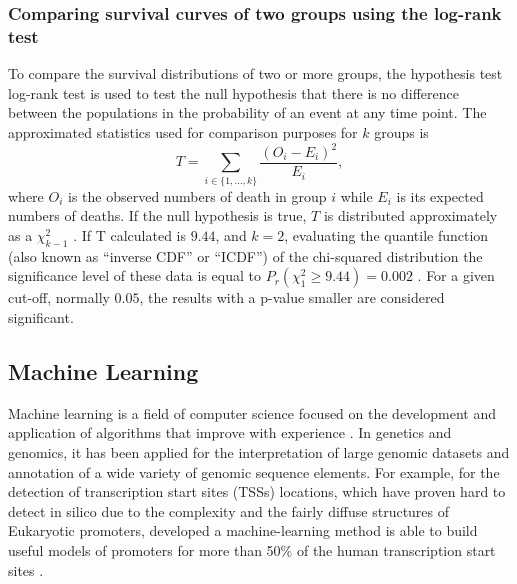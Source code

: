 
\subsubsection{Comparing survival curves of two groups using the log-rank test}

 To compare the survival distributions of two or more groups,  the hypothesis test log-rank test is
 used to test the null hypothesis that there is no difference between the populations
 in the probability of an event at any time point.
%
 The approximated statistics used for comparison purposes for $k$ groups is
 $$T = \sum_{i \in \{1,\ldots,k\}}\frac{(O_i - E_i)^2}{E_i},$$
 where $O_i$ is the observed numbers of death in  group $i$
 while $E_i$ is its expected numbers of deaths.
 If the null hypothesis is true, $T$ is distributed approximately as a $\chi^2_{k-1}$ \cite{matthews1996using}.
If T calculated is $9.44$, and $k = 2$,  evaluating the quantile function (also known as “inverse CDF” or “ICDF”) of the chi-squared distribution the significance level of these data is equal to
$P_r(\chi^2_{1}\geq9.44) = 0.002$ \cite{yau2012r}.
For a given cut-off, normally $0.05$, the results with a p-value smaller are considered significant.

\subsection{Machine Learning}

Machine learning is a field of computer science focused on the development and application of algorithms that improve with experience \cite{mitchell1997machine}.
In genetics and genomics, it has been applied
 for the interpretation of large genomic datasets and annotation of a wide variety of genomic sequence elements.
For example, for the detection of  transcription start sites (TSSs) locations, which have proven hard to detect in silico due to the complexity and the fairly diffuse structures of Eukaryotic promoters,  developed a machine-learning method is able to build useful models of promoters for more than 50\% of the human transcription start sites \cite{down2002computational}.

